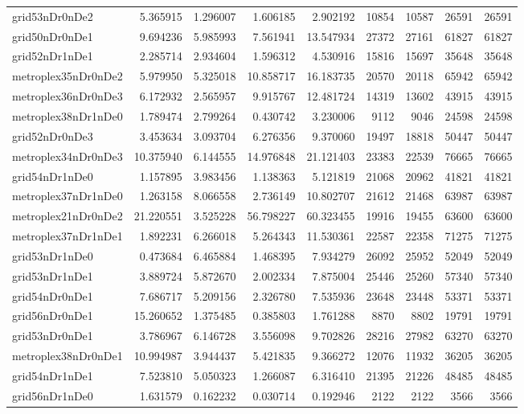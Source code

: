 \begin{longtable}{|l|r|r|r|r|r|r|r|r|}
grid53nDr0nDe2 & 5.365915 & 1.296007 & 1.606185 & 2.902192 & 10854 & 10587 & 26591 & 26591 \\
grid50nDr0nDe1 & 9.694236 & 5.985993 & 7.561941 & 13.547934 & 27372 & 27161 & 61827 & 61827 \\
grid52nDr1nDe1 & 2.285714 & 2.934604 & 1.596312 & 4.530916 & 15816 & 15697 & 35648 & 35648 \\
metroplex35nDr0nDe2 & 5.979950 & 5.325018 & 10.858717 & 16.183735 & 20570 & 20118 & 65942 & 65942 \\
metroplex36nDr0nDe3 & 6.172932 & 2.565957 & 9.915767 & 12.481724 & 14319 & 13602 & 43915 & 43915 \\
metroplex38nDr1nDe0 & 1.789474 & 2.799264 & 0.430742 & 3.230006 & 9112 & 9046 & 24598 & 24598 \\
grid52nDr0nDe3 & 3.453634 & 3.093704 & 6.276356 & 9.370060 & 19497 & 18818 & 50447 & 50447 \\
metroplex34nDr0nDe3 & 10.375940 & 6.144555 & 14.976848 & 21.121403 & 23383 & 22539 & 76665 & 76665 \\
grid54nDr1nDe0 & 1.157895 & 3.983456 & 1.138363 & 5.121819 & 21068 & 20962 & 41821 & 41821 \\
metroplex37nDr1nDe0 & 1.263158 & 8.066558 & 2.736149 & 10.802707 & 21612 & 21468 & 63987 & 63987 \\
metroplex21nDr0nDe2 & 21.220551 & 3.525228 & 56.798227 & 60.323455 & 19916 & 19455 & 63600 & 63600 \\
metroplex37nDr1nDe1 & 1.892231 & 6.266018 & 5.264343 & 11.530361 & 22587 & 22358 & 71275 & 71275 \\
grid53nDr1nDe0 & 0.473684 & 6.465884 & 1.468395 & 7.934279 & 26092 & 25952 & 52049 & 52049 \\
grid53nDr1nDe1 & 3.889724 & 5.872670 & 2.002334 & 7.875004 & 25446 & 25260 & 57340 & 57340 \\
grid54nDr0nDe1 & 7.686717 & 5.209156 & 2.326780 & 7.535936 & 23648 & 23448 & 53371 & 53371 \\
grid56nDr0nDe1 & 15.260652 & 1.375485 & 0.385803 & 1.761288 & 8870 & 8802 & 19791 & 19791 \\
grid53nDr0nDe1 & 3.786967 & 6.146728 & 3.556098 & 9.702826 & 28216 & 27982 & 63270 & 63270 \\
metroplex38nDr0nDe1 & 10.994987 & 3.944437 & 5.421835 & 9.366272 & 12076 & 11932 & 36205 & 36205 \\
grid54nDr1nDe1 & 7.523810 & 5.050323 & 1.266087 & 6.316410 & 21395 & 21226 & 48485 & 48485 \\
grid56nDr1nDe0 & 1.631579 & 0.162232 & 0.030714 & 0.192946 & 2122 & 2122 & 3566 & 3566 \\

\end{longtable}

